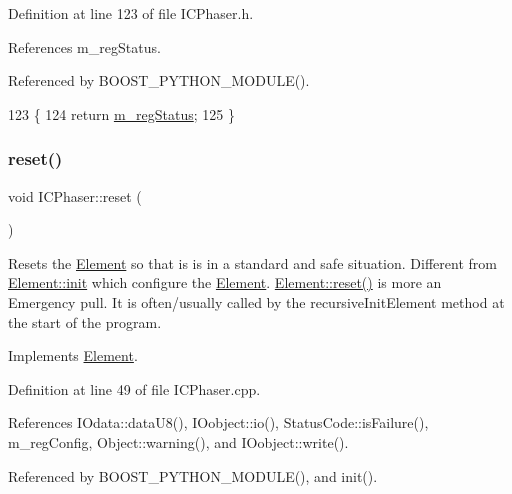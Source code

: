 Definition at line 123 of file I\+C\+Phaser.\+h.



References m\+\_\+reg\+Status.



Referenced by B\+O\+O\+S\+T\+\_\+\+P\+Y\+T\+H\+O\+N\+\_\+\+M\+O\+D\+U\+L\+E().


\begin{DoxyCode}
123                        \{
124     \textcolor{keywordflow}{return} \hyperlink{classICPhaser_adcc37517abf1390407003c387008262d}{m\_regStatus};
125   \}
\end{DoxyCode}
\mbox{\label{classICPhaser_aa20b5b71ef76a97b9ff9688cb360293c}} 
\subsubsection{\texorpdfstring{reset()}{reset()}}
{\footnotesize\ttfamily void I\+C\+Phaser\+::reset (\begin{DoxyParamCaption}{ }\end{DoxyParamCaption})\hspace{0.3cm}{\ttfamily [virtual]}}

Resets the \hyperlink{classElement}{Element} so that is is in a standard and safe situation. Different from \hyperlink{classElement_af42754b5cabc198869222725218d695c}{Element\+::init} which configure the \hyperlink{classElement}{Element}. \hyperlink{classElement_a69efffa22f06909d768149715565cb56}{Element\+::reset()} is more an Emergency pull. It is often/usually called by the recursive\+Init\+Element method at the start of the program. 

Implements \hyperlink{classElement_a69efffa22f06909d768149715565cb56}{Element}.



Definition at line 49 of file I\+C\+Phaser.\+cpp.



References I\+Odata\+::data\+U8(), I\+Oobject\+::io(), Status\+Code\+::is\+Failure(), m\+\_\+reg\+Config, Object\+::warning(), and I\+Oobject\+::write().



Referenced by B\+O\+O\+S\+T\+\_\+\+P\+Y\+T\+H\+O\+N\+\_\+\+M\+O\+D\+U\+L\+E(), and init().


